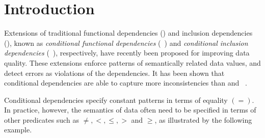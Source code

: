 


\section{Introduction}
\label{sec-intro}



Extensions of traditional functional dependencies (\FDs) and inclusion dependencies
(\INDs), known as {\em conditional functional dependencies} (\CFDs~\cite{CFDs})
and {\em conditional inclusion dependencies} (\CINDs~\cite{tcs-CINDs}),
respectively, have recently been proposed for improving data quality.
These extensions enforce patterns of semantically
related data values, and
detect errors as violations of the dependencies.
It has been shown that conditional dependencies are able to capture more inconsistencies
than \FDs and \INDs~\cite{CFDs,repair,CINDs,tcs-CINDs}.

Conditional dependencies specify constant patterns in terms of
equality $(=)$. In practice, however, the semantics of data often
need to be specified in terms of other predicates such as
$\ne, <, \le, >$ and $\ge$, as illustrated by the following example.



